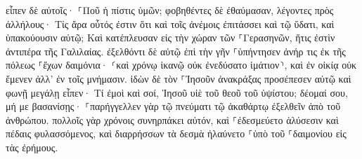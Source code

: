 \documentclass{openreader}
\begin{document}
εἶπεν δὲ αὐτοῖς· ⸀Ποῦ ἡ πίστις ὑμῶν; φοβηθέντες δὲ ἐθαύμασαν, λέγοντες πρὸς ἀλλήλους· Τίς ἄρα οὗτός ἐστιν ὅτι καὶ τοῖς ἀνέμοις ἐπιτάσσει καὶ τῷ ὕδατι, καὶ ὑπακούουσιν αὐτῷ; 
Καὶ κατέπλευσαν εἰς τὴν χώραν τῶν ⸀Γερασηνῶν, ἥτις ἐστὶν ἀντιπέρα τῆς Γαλιλαίας. 
ἐξελθόντι δὲ αὐτῷ ἐπὶ τὴν γῆν ⸀ὑπήντησεν ἀνήρ τις ἐκ τῆς πόλεως ⸀ἔχων δαιμόνια· ⸂καὶ χρόνῳ ἱκανῷ οὐκ ἐνεδύσατο ἱμάτιον⸃, καὶ ἐν οἰκίᾳ οὐκ ἔμενεν ἀλλ’ ἐν τοῖς μνήμασιν. 
ἰδὼν δὲ τὸν ⸀Ἰησοῦν ἀνακράξας προσέπεσεν αὐτῷ καὶ φωνῇ μεγάλῃ εἶπεν· Τί ἐμοὶ καὶ σοί, Ἰησοῦ υἱὲ τοῦ θεοῦ τοῦ ὑψίστου; δέομαί σου, μή με βασανίσῃς· 
⸀παρήγγελλεν γὰρ τῷ πνεύματι τῷ ἀκαθάρτῳ ἐξελθεῖν ἀπὸ τοῦ ἀνθρώπου. πολλοῖς γὰρ χρόνοις συνηρπάκει αὐτόν, καὶ ⸀ἐδεσμεύετο ἁλύσεσιν καὶ πέδαις φυλασσόμενος, καὶ διαρρήσσων τὰ δεσμὰ ἠλαύνετο ⸀ὑπὸ τοῦ ⸀δαιμονίου εἰς τὰς ἐρήμους. 
\end{document}
